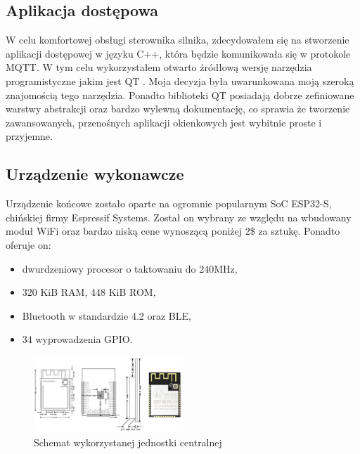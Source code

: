 \documentclass[eng, 11pt]{mgr}
\begin{document}
      \subsection{Aplikacja dostępowa}
        W celu komfortowej obsługi sterownika silnika,
        zdecydowałem się na stworzenie aplikacji dostępowej w 
        języku C++, która będzie komunikowała się w protokole MQTT.
        W tym celu wykorzystałem otwarto źródłową wersję narzędzia
        programistyczne jakim jest QT \cite{qt}. 
        Moja decyzja była uwarunkowana moją szeroką znajomością
        tego narzędzia. Ponadto biblioteki QT posiadają dobrze 
        zefiniowane warstwy abstrakcji oraz bardzo wylewną 
        dokumentację, co sprawia że tworzenie zawansowanych, 
        przenośnych aplikacji okienkowych jest wybitnie proste i 
        przyjemne. 

      \subsection{Urządzenie wykonawcze}
        Urządzenie końcowe zostało oparte na ogromnie popularnym
        SoC ESP32-S, chińskiej firmy Espressif Systems. 
        Został on wybrany ze względu na wbudowany moduł WiFi oraz
        bardzo niską cene wynoszącą poniżej 2\$ za sztukę. 
        Ponadto oferuje on:

        \begin{itemize}
          \item dwurdzeniowy procesor o taktowaniu do 240MHz,
          \item 320 KiB RAM, 448 KiB ROM,
          \item Bluetooth w standardzie 4.2 oraz BLE,
          \item 34 wyprowadzenia GPIO.
        \end{itemize}


        \begin{figure}[ht]
          \centering
          \includegraphics[width=0.5\textwidth]{img/esp32.jpg}
          \caption{Schemat wykorzystanej jednostki centralnej}
        \end{figure}
\end{document}
